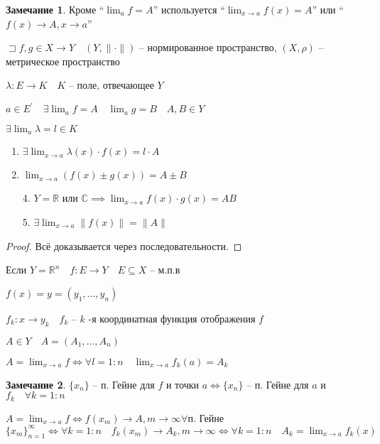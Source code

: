 \documentclass{book}
\newcommand\R{\ensuremath{\mathbb{R}}}
\renewcommand\C{\ensuremath{\mathbb{C}}}
\newcommand{\p}[1]{#1^{\prime}}
\theoremstyle{definition}
\newtheorem*{note}{Замечание}
\begin{document}
\begin{note}
    Кроме ``$\lim_af=A$'' используется ``$\lim_{x \to a} f(x)=A$'' или ``$f(x)\to A, x\to a$''
\end{note}

\begin{theorem}

    $\sqsupset f, g\in X\to Y\quad (Y, \|\cdot \|)$ -- нормированное пространство, $(X, \rho)$ -- метрическое пространство

     $\lambda:E\to K\quad K$ -- поле, отвечающее $Y$

     $a\in \p E\quad \exists \lim_af=A\quad \lim_ag = B\quad A, B\in Y$

     $\exists \lim_a\lambda = l\in K$

     \begin{enumerate}
         \item $\exists \lim_{x \to a} \lambda(x)\cdot f(x) = l\cdot A$
         \item $\lim_{x \to a} \left( f(x)\pm g(x) \right) =A\pm B$
         \item[4.] $Y=\R$ или $\C \implies \lim_{x \to a} f(x)\cdot g(x) = AB$
         \item[5.] $\exists \lim_{x \to a} \|f(x)\| = \|A\|$
     \end{enumerate}
\end{theorem}
\begin{proof}
    Всё доказывается через последовательности.
\end{proof}

    Если $Y = \R^n\quad f:E\to Y\quad E\subseteq X$ -- м.п.в

    $f(x) = y = (y_1, \ldots, y_{n})$

    $f_k:x\to y_k\quad f_k$ --  $k$ -я координатная функция отображения  $f$

    $A\in Y\quad A = (A_1, \ldots, A_n)$

    $A = \lim_{x \to a} f \iff \forall l = 1:n\quad \lim_{x \to a} f_k(a) = A_k$
\begin{note}
    $\{x_{n} \}$ -- п. Гейне для $f$ и точки  $a \iff \{x_{n} \}$ -- п. Гейне для $a$ и  $f_k\quad \forall k = 1:n$

    $A = \lim_{x \to a} f \iff f(x_m)\to A, m\to \infty  \forall $п. Гейне $\{x_m\}_{n=1}^{\infty } \iff \forall k=1:n\quad f_k(x_m)\to A_k, m\to \infty  \iff \forall k=1:n\quad A_k = \lim_{x \to a} f_k(x)$
\end{note}
\end{document}
